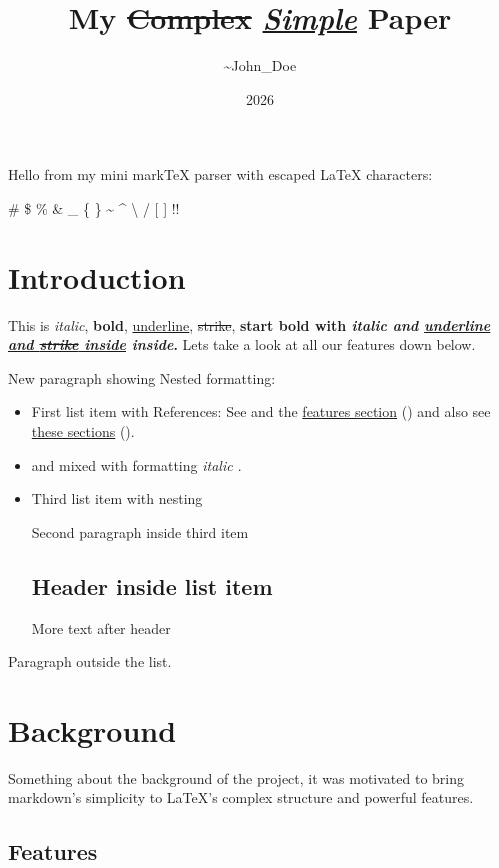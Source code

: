 \documentclass{article}
\title{My \sout{Complex} \textbf{\underline{\textit{Simple}} Paper}}
\author{\textasciitilde{}John\_Doe}
\date{2026}
\begin{document}
\maketitle


Hello from my mini markTeX parser with escaped LaTeX characters:

\# \$ \% \& \_ \{ \} \textasciitilde{} \textasciicircum{} \textbackslash{} / {[} {]} !!

\section{Introduction }\label{sec:intro}

This is \textit{italic}, \textbf{bold}, \underline{underline}, \sout{strike}, \textbf{start bold with \textit{italic and \underline{underline and \sout{strike} inside} inside}.} Lets take a look at all our features down below.

New paragraph showing Nested formatting:

\begin{itemize}
\item First list item with References: See  and the \hyperref[sec:features]{features section} () and also see \hyperref[sec:intro]{these sections} (). 
\item \cite{paper1,paper_2026} and \cite{paper1} mixed with formatting \textit{italic \cite{paper1,paper_2026}}.
\item Third list item with nesting

Second paragraph inside third item

\subsection{Header inside list item }\label{sec:list-header}

More text after header
\end{itemize}

Paragraph outside the list.

\section{Background }\label{sec:background}

Something about the background of the project, it was motivated to bring markdown's simplicity to LaTeX's complex structure and powerful features.

\subsection{Features }\label{sec:features}
\end{document}

